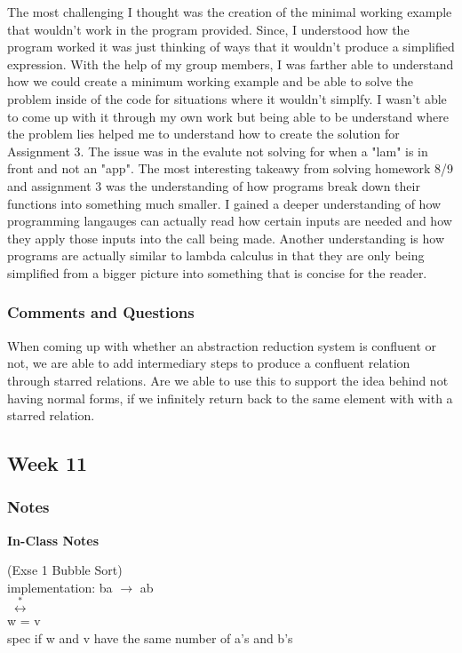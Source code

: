 \documentclass{article}
\theoremstyle{theorem}
\theoremstyle{definition}
\theoremstyle{remark}
\begin{document}
The most challenging I thought was the creation of the minimal working example that wouldn't work in the program provided. Since, I understood
how the program worked it was just thinking of ways that it wouldn't produce a simplified expression. With the help of my group members, I was 
farther able to understand how we could create a minimum working example and be able to solve the problem inside of the code for situations where 
it wouldn't simplfy. I wasn't able to come up with it through my own work but being able to be understand where the problem lies helped me to understand 
how to create the solution for Assignment 3. The issue was in the evalute not solving for when a "lam" is in front and not an "app". The most interesting
takeawy from solving homework 8/9 and assignment 3 was the understanding of how programs break down their functions into something much smaller. I 
gained a deeper understanding of how programming langauges can actually read how certain inputs are needed and how they apply those inputs into the 
call being made. Another understanding is how programs are actually similar to lambda calculus in that they are only being simplified from a bigger picture
into something that is concise for the reader. 

\subsubsection{Comments and Questions}

When coming up with whether an abstraction reduction system is confluent or not, we are able to add intermediary steps to produce a confluent relation through starred relations. 
Are we able to use this to support the idea behind not having normal forms, if we infinitely return back to the same element with with a starred relation.

\subsection{Week 11}
\subsubsection{Notes}

\textbf{In-Class Notes}

(Exse 1 Bubble Sort) \\
implementation: ba $\to$ ab \\
$\;\stackrel{\ast}{\longleftrightarrow}\;$ \\
w = v \\
spec {if w and v have the same number of a's and b's} \\ 
\end{document}
